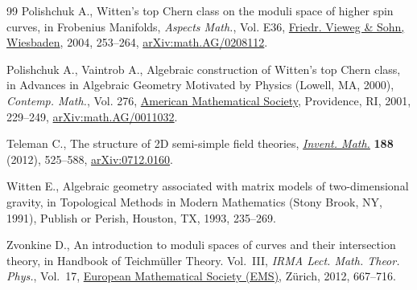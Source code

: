 \begin{thebibliography}{99}
Polishchuk A., Witten's top {C}hern class on the moduli space of higher spin
 curves, in Frobenius {M}anifolds, \textit{Aspects Math.}, Vol. E36, \href{https://doi.org/10.1007/978-3-322-80236-1_10}{Friedr.
 Vieweg \& Sohn, Wiesbaden}, 2004, 253--264, \href{https://arxiv.org/abs/math.AG/0208112}{arXiv:math.AG/0208112}.

Polishchuk A., Vaintrob A., Algebraic construction of {W}itten's top {C}hern
 class, in Advances in {A}lgebraic {G}eometry {M}otivated by {P}hysics
 ({L}owell, {MA}, 2000), \textit{Contemp. Math.}, Vol. 276, \href{https://doi.org/10.1090/conm/276/04523}{American
 Mathematical Society}, Providence, RI, 2001, 229--249,
 \href{https://arxiv.org/abs/math.AG/0011032}{arXiv:math.AG/0011032}.

Teleman C., The structure of 2{D} semi-simple field theories, \href{https://doi.org/10.1007/s00222-011-0352-5}{\textit{Invent.
 Math.}} \textbf{188} (2012), 525--588, \href{https://arxiv.org/abs/0712.0160}{arXiv:0712.0160}.

Witten E., Algebraic geometry associated with matrix models of two-dimensional
 gravity, in Topological {M}ethods in {M}odern {M}athematics ({S}tony {B}rook,
 {NY}, 1991), Publish or Perish, Houston, TX, 1993, 235--269.

Zvonkine D., An introduction to moduli spaces of curves and their intersection
 theory, in Handbook of {T}eichm\"uller {T}heory. {V}ol.~{III}, \textit{IRMA
 Lect. Math. Theor. Phys.}, Vol.~17, \href{https://doi.org/10.4171/103-1/12}{European Mathematical Society (EMS)},
 Z\"urich, 2012, 667--716.

\end{thebibliography}
